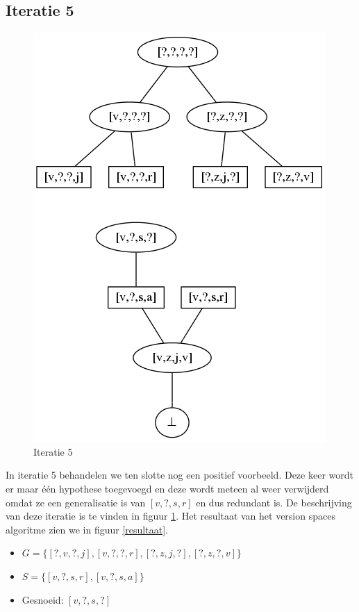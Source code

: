 \documentclass[alternative-exam.tex]{subfiles}
\begin{document}
\subsection{Iteratie 5}
\begin{figure}
[H]
\centering
\caption{Iteratie 5}
\label{iter_5}
\includegraphics[scale=0.5]{resources/graphs/iteration_5.png}
\end{figure}
In iteratie 5 behandelen we ten slotte nog een positief voorbeeld. Deze keer wordt er maar \'e\'en hypothese toegevoegd en deze wordt meteen al weer verwijderd omdat ze een generalisatie is van $[v,?,s,r]$ en dus redundant is. De beschrijving van deze iteratie is te vinden in figuur \ref{iter_5}. Het resultaat van het version spaces algoritme zien we in figuur \ref{resultaat}.
\begin{itemize}
\item $G = \{[?,v,?,j],[v,?,?,r],[?,z,j,?],[?,z,?,v]\}$
\item $S = \{[v,?,s,r],[v,?,s,a]\}$
\item Gesnoeid: $[v,?,s,?]$
\end{itemize}
\end{document}
